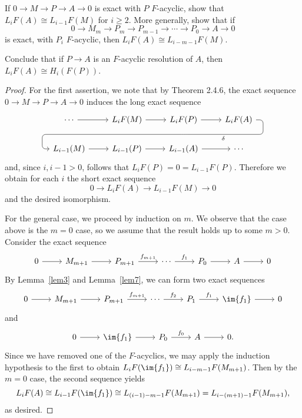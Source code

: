 \documentclass[10pt]{amsart}
\begin{document}
\begin{ex}
  If $0 \rightarrow M \rightarrow P \rightarrow A \rightarrow 0$ is exact with $P$ $F$-acyclic, show that $L_iF(A) \cong L_{i-1}F(M)$ for $i \geq 2$.
  More generally, show that if
  $$0 \rightarrow M_m \rightarrow P_m \rightarrow P_{m-1} \rightarrow \cdots \rightarrow P_0 \rightarrow A \rightarrow 0$$
  is exact, with $P_i$ $F$-acyclic, then $L_iF(A) \cong L_{i-m-1}F(M)$.

  Conclude that if $P \rightarrow A$ is an $F$-acyclic resolution of $A$, then $L_iF(A) \cong H_i(F(P))$.

  \begin{proof}
    For the first assertion, we note that by Theorem 2.4.6, the exact sequence $0 \rightarrow M \rightarrow P \rightarrow A \rightarrow 0$ induces the long exact sequence
    $$\begin{tikzcd}
      \cdots \arrow{r} & L_iF(M) \arrow{r} & L_iF(P) \arrow[d, phantom, ""{coordinate, name=Z}] \arrow{r} & L_iF(A) \arrow[dlll, "\delta",rounded corners, to path={ -- ([xshift=2ex]\tikztostart.east) |- (Z) [near end]\tikztonodes -| ([xshift=-2ex]\tikztotarget.west) -- (\tikztotarget)}]\\
      L_{i-1}(M) \arrow{r} & L_{i-1}(P) \arrow{r} & L_{i-1}(A) \arrow{r} & \cdots
    \end{tikzcd}$$
    and, since $i, i - 1 > 0$, follows that $L_iF(P) = 0 = L_{i-1}F(P)$.
    Therefore we obtain for each $i$ the short exact sequence
    $$0 \rightarrow L_iF(A) \rightarrow L_{i-1}F(M) \rightarrow 0$$
    and the desired isomorphism.

    For the general case, we proceed by induction on $m$.
    We observe that the case above is the $m = 0$ case, so we assume that the result holds up to some $m > 0$.
    Consider the exact sequence
    $$\begin{tikzcd}
      0 \arrow{r} & M_{m+1} \arrow{r} & P_{m+1} \arrow{r}{f_{m+1}} & \cdots \arrow{r}{f_1} & P_0 \arrow{r} & A \arrow{r} & 0
    \end{tikzcd}$$
    By Lemma~\ref{lem3} and Lemma~\ref{lem7}, we can form two exact sequences
    $$\begin{tikzcd}
      0 \arrow{r} & M_{m+1} \arrow{r} & P_{m+1} \arrow{r}{f_{m+1}} & \cdots \arrow{r}{f_2} & P_1 \arrow{r}{f_1} & \im{f_1} \arrow{r} & 0
    \end{tikzcd}$$
    and
    $$\begin{tikzcd}
      0 \arrow{r} & \im{f_1} \arrow{r} & P_0 \arrow{r}{f_0} & A \arrow{r} & 0.
    \end{tikzcd}$$
    Since we have removed one of the $F$-acyclics, we may apply the induction hypothesis to the first to obtain $L_iF(\im{f_1}) \cong L_{i - m - 1}F(M_{m+1})$.
    Then by the $m = 0$ case, the second sequence yields 
    $$L_iF(A) \cong L_{i - 1}F(\im{f_1}) \cong L_{(i-1) - m - 1}F(M_{m+1}) = L_{i - (m + 1) - 1}F(M_{m+1}),$$
    as desired.


\end{proof}
\end{ex}
\end{document}
